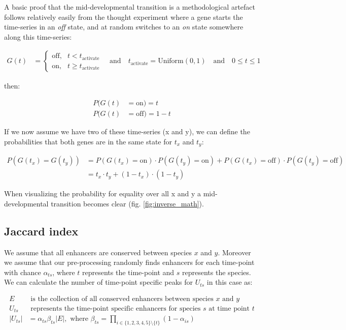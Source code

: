 A basic proof that the mid-developmental transition is a methodological artefact follows relatively easily from the thought experiment where a gene starts the time-series in an \textit{off} state, and at random switches to an \textit{on} state somewhere along this time-series:

\begin{align*}    
    G(t) & = \begin{cases} \text{off},& t < t_{\text{activate}} \\ \text{on},& t \geq t_{\text{activate}} \end{cases} \quad \textrm{and} \quad
    t_{\text{activate}} = \text{Uniform}(0, 1) \quad \textrm{and} \quad
    0 \leq t \leq 1
\end{align*}

then:

\begin{align*}
    P(G(t) & = \text{on}) = t \\
    P(G(t) & = \text{off}) = 1 - t
\end{align*}

If we now assume we have two of these time-series (x and y), we can define the probabilities that both genes are in the same state for $t_x$ and $t_y$:

\begin{align*}
    P(G(t_x) = G(t_y)) & = P(G(t_x) = \text{on}) \cdot P(G(t_y) = \text{on}) + P(G(t_x) = \text{off}) \cdot P(G(t_y) = \text{off}) \\
    & = t_x \cdot t_y + (1 - t_x) \cdot (1-t_y)
\end{align*}

When visualizing the probability for equality over all x and y a mid-developmental transition becomes clear (fig. \ref{fig:inverse_math}).

\subsection{Jaccard index}\label{subsection:flypeaks}

We assume that all enhancers are conserved between species $x$ and $y$. Moreover we assume that our pre-processing randomly finds enhancers for each time-point with chance $\alpha_{ts}$, where $t$ represents the time-point and $s$ represents the species. We can calculate the number of time-point specific peaks for $U_{ts}$ in this case as:

\begin{align*}
    E & \text{ is the collection of all conserved enhancers between species } x \text{ and } y \\
    U_{ts} & \text{ represents the time-point specific enhancers for species } s \text{ at time point } t \\
    |U_{ts}| & = \alpha_{ts} \beta_{ts} |E|, \text{ where } \beta_{ts} = \prod_{i \in \{1, 2, 3, 4, 5\}\setminus\{t\}} (1 - \alpha_{is}) \\
\end{align*}

